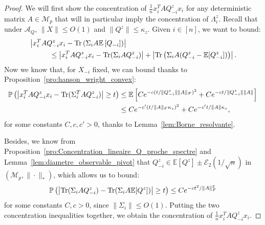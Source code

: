 \documentclass[a4papaer, titlepage]{book}
\begin{document}
\begin{proof}
We will first show the concentration of $\frac{1}{n}x_i^T AQ^z_{-i}x_i$ for any deterministic matrix $A \in \mathcal{M}_{p}$ that will in particular imply the concentration of $\Lambda_i^z$.
Recall that under $\mathcal A_Q$, $\|X\|\leq O(1)$ and $\|Q^z\| \leq \kappa_z$. Given $i \in [n]$, 
we want to bound:
\begin{align*}
  &\left\vert x_i^T AQ^z_{-i}x_i - \operatorname{Tr} \left( \Sigma_i A \mathbb E \left[ Q_{-i}\right] \right)\right\vert\\
  &\hspace{1cm}\leq \left\vert x_i^T AQ^z_{-i}x_i -  \operatorname{Tr} (\Sigma_iA Q^z_{-i})\right\vert + \left\vert  \operatorname{Tr} \left(  \Sigma_iA (Q^z_{-i} - \mathbb E[Q^z_{-i}]) \right)\right\vert.
\end{align*}
Now we know that, for $X_{-i}$ fixed, we can bound thanks to Proposition~\ref{pro:hanson_wright_convex}:
\begin{align*}
  \mathbb P \left( \left\vert x_i^T AQ^z_{-i}x_i -  \operatorname{Tr} (\Sigma_i^T AQ^z_{-i})\right\vert \geq t  \right)
  &\leq \mathbb E \left[ Ce^{-c(t/\|Q_{-i}^z\| \|A\|_F)^2} + Ce^{-ct/\|Q_{-i}^z\| \|A\|} \right] \\
  &\leq  Ce^{-c'(t/\|A\|_F\kappa_z)^2} + Ce^{-c't/\|A\|\kappa_z},
\end{align*}
for some constants $C,c,c'>0$, thanks to Lemma~\ref{lem:Borne_resolvante}.

Besides, we know from Proposition~\ref{pro:Concentration_lineaire_Q_proche_spectre} and Lemma~\ref{lem:diametre_observable_pivot} that $Q_{-i}^z \in \mathbb E[Q^z] \pm \mathcal E_2(1/\sqrt n)$ in $(\mathcal{M}_{p}, \|\cdot\|_*)$, which allows us to bound:
\begin{align*}
  \mathbb P \left( \left\vert \operatorname{Tr} (\Sigma_i A Q^z_{-i}) - \operatorname{Tr} (\Sigma_i A \mathbb E[Q^z])\right\vert \geq t  \right)
  \leq  Ce^{-ct^2/\|A\|_F^2}
\end{align*}
for some constants $C,c>0$, since $\|\Sigma_i\|\leq O(1)$. Putting the two concentration inequalities together, we obtain the concentration of $\frac{1}{n}x_i^T AQ_{-i}^zx_i$.


\end{proof}
\end{document}
